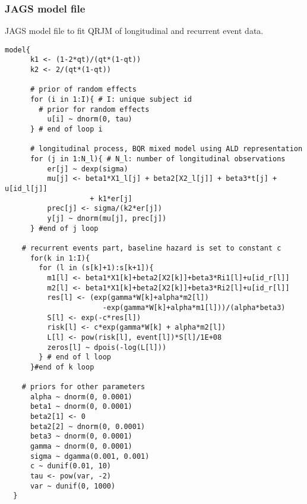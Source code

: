 \newpage
\subsubsection{\textsf{JAGS} model file}
\textsf{JAGS} model file to fit QRJM of longitudinal and recurrent event data.
{\small
\begin{verbatim}
model{
      k1 <- (1-2*qt)/(qt*(1-qt))
      k2 <- 2/(qt*(1-qt))

      # prior of random effects
      for (i in 1:I){ # I: unique subject id
        # prior for random effects
          u[i] ~ dnorm(0, tau)
      } # end of loop i

      # longitudinal process, BQR mixed model using ALD representation
      for (j in 1:N_l){ # N_l: number of longitudinal observations
          er[j] ~ dexp(sigma)
          mu[j] <- beta1*X1_l[j] + beta2[X2_l[j]] + beta3*t[j] + u[id_l[j]]
          			+ k1*er[j]
          prec[j] <- sigma/(k2*er[j])
          y[j] ~ dnorm(mu[j], prec[j])
      } #end of j loop

    # recurrent events part, baseline hazard is set to constant c
      for(k in 1:I){
        for (l in (s[k]+1):s[k+1]){
          m1[l] <- beta1*X1[k]+beta2[X2[k]]+beta3*Ri1[l]+u[id_r[l]]
          m2[l] <- beta1*X1[k]+beta2[X2[k]]+beta3*Ri2[l]+u[id_r[l]]
          res[l] <- (exp(gamma*W[k]+alpha*m2[l])
                       -exp(gamma*W[k]+alpha*m1[l]))/(alpha*beta3)
          S[l] <- exp(-c*res[l])
          risk[l] <- c*exp(gamma*W[k] + alpha*m2[l])
          L[l] <- pow(risk[l], event[l])*S[l]/1E+08
          zeros[l] ~ dpois(-log(L[l]))
        } # end of l loop
      }#end of k loop

    # priors for other parameters
      alpha ~ dnorm(0, 0.0001)
      beta1 ~ dnorm(0, 0.0001)
      beta2[1] <- 0
      beta2[2] ~ dnorm(0, 0.0001)
      beta3 ~ dnorm(0, 0.0001)
      gamma ~ dnorm(0, 0.0001)
      sigma ~ dgamma(0.001, 0.001)
      c ~ dunif(0.01, 10)
      tau <- pow(var, -2)
      var ~ dunif(0, 1000)
  }
\end{verbatim}
}
